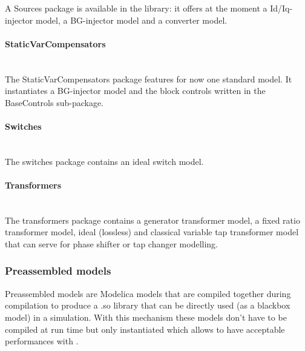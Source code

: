 \documentclass[a4paper, 12pt]{report}
\begin{document}
A Sources package is available in the library: it offers at the moment a Id/Iq-injector model, a BG-injector model and a converter model.

\paragraph{StaticVarCompensators}
~~\\

The StaticVarCompensators package features for now one standard model. It instantiates a BG-injector model and the block controls written in the BaseControls sub-package.

\paragraph{Switches}
~~\\

The switches package contains an ideal switch model.

\paragraph{Transformers}
~~\\

The transformers package contains a generator transformer model, a fixed ratio transformer model, ideal (lossless) and classical variable tap transformer model that can serve for phase shifter or tap changer modelling.

\subsubsection{Preassembled models}

Preassembled models are Modelica models that are compiled together during \Dynawo compilation to produce a .so library that can be directly used (as a blackbox model) in a simulation. With this mechanism these models don't have to be compiled at run time but only instantiated which allows to have acceptable performances with \Dynawo. \\
\end{document}
